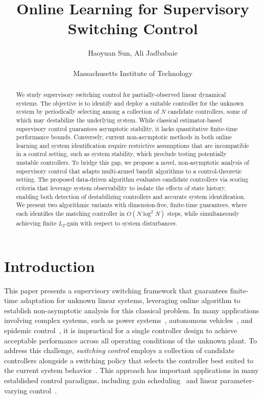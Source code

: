 \documentclass[11pt, twoside]{article}
\title{\textbf{Online Learning for Supervisory Switching Control}}
\author{Haoyuan Sun, Ali Jadbabaie\\ \\Massachusetts Institute of Technology}
\date{}
\newcounter{criteria}
\theoremstyle{definition}
\begin{document}
\maketitle

\begin{abstract}
    We study supervisory switching control for partially-observed linear dynamical systems.
    The objective is to identify and deploy a suitable controller for the unknown system by periodically selecting among a collection of $N$ candidate controllers, some of which may destabilize the underlying system.
    While classical estimator-based supervisory control guarantees asymptotic stability, it lacks quantitative finite-time performance bounds.
    Conversely, current non-asymptotic methods in both online learning and system identification require restrictive assumptions that are incompatible in a control setting, such as system stability, which preclude testing potentially unstable controllers.
To bridge this gap, we propose a novel, non-asymptotic analysis of supervisory control that adapts multi-armed bandit algorithms to a control-theoretic setting.
    The proposed data-driven algorithm evaluates candidate controllers via scoring criteria that leverage system observability to isolate the effects of state history, enabling both detection of destabilizing controllers and accurate system identification.
    We present two algorithmic variants with dimension-free, finite-time guarantees, where each identifies the matching controller in $O(N \log^2 N)$ steps, while simultaneously achieving finite $L_2$-gain with respect to system disturbances.

\end{abstract}

\renewcommand{\thefootnote}{\roman{footnote}}
\renewcommand{\thefootnote}{\arabic{footnote}}

\section{Introduction}
This paper presents a supervisory switching framework that guarantees finite-time adaptation for unknown linear systems, leveraging online algorithm to establish non-asymptotic analysis for this classical problem.
In many applications involving complex systems, such as power systems~\citep{meng2016microgrid}, autonomous vehicles~\citep{aguiar2007trajectory}, and epidemic control~\citep{bin2021hysteresis}, it is impractical for a single controller design to achieve acceptable performance across all operating conditions of the unknown plant.
To address this challenge, \textit{switching control} employs a collection of candidate controllers alongside a switching policy that selects the controller best suited to the current system behavior~\cite{liberzon2003switching}.
This approach has important applications in many established control paradigms, including gain scheduling~\citep{shamma2002gain, rugh2000research} and linear parameter-varying control~\citep{wu1995control,mohammadpour2012control}.
\end{document}

